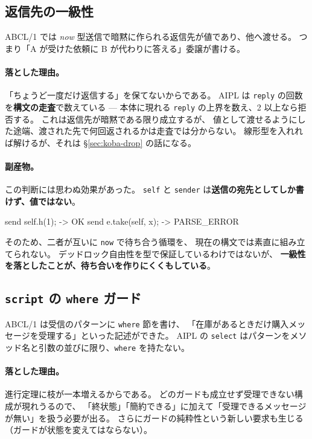 \documentclass[11pt,a4paper]{ltjsarticle}
\theoremstyle{definition}
\theoremstyle{remark}
\begin{document}
\subsection{返信先の一級性}

ABCL/1 では \emph{now} 型送信で暗黙に作られる返信先が値であり、他へ渡せる。
つまり「A が受けた依頼に B が代わりに答える」委譲が書ける。

\paragraph{落とした理由。}
「ちょうど一度だけ返信する」を保てないからである。
AIPL は \texttt{reply} の回数を\textbf{構文の走査}で数えている ---
本体に現れる \texttt{reply} の上界を数え、2 以上なら拒否する。
これは返信先が暗黙である限り成立するが、
値として渡せるようにした途端、渡された先で何回返されるかは走査では分からない。
線形型を入れれば解けるが、それは \S\ref{sec:koba-drop} の話になる。

\paragraph{副産物。}
この判断には思わぬ効果があった。
\texttt{self} と \texttt{sender} は\textbf{送信の宛先としてしか書けず、値ではない}。

\begin{term}
send self.h(1);          -> OK
send e.take(self, x);    -> PARSE_ERROR
\end{term}

そのため、二者が互いに \texttt{now} で待ち合う循環を、
現在の構文では素直に組み立てられない。
デッドロック自由性を型で保証しているわけではないが、
\textbf{一級性を落としたことが、待ち合いを作りにくくもしている}。

\subsection{\texttt{script} の \texttt{where} ガード}

ABCL/1 は受信のパターンに \texttt{where} 節を書け、
「在庫があるときだけ購入メッセージを受理する」といった記述ができた。
AIPL の \texttt{select} はパターンをメソッド名と引数の並びに限り、\texttt{where} を持たない。

\paragraph{落とした理由。}
進行定理に枝が一本増えるからである。
どのガードも成立せず受理できない構成が現れうるので、
「終状態」「簡約できる」に加えて「受理できるメッセージが無い」を扱う必要が出る。
さらにガードの純粋性という新しい要求も生じる（ガードが状態を変えてはならない）。
\end{document}
